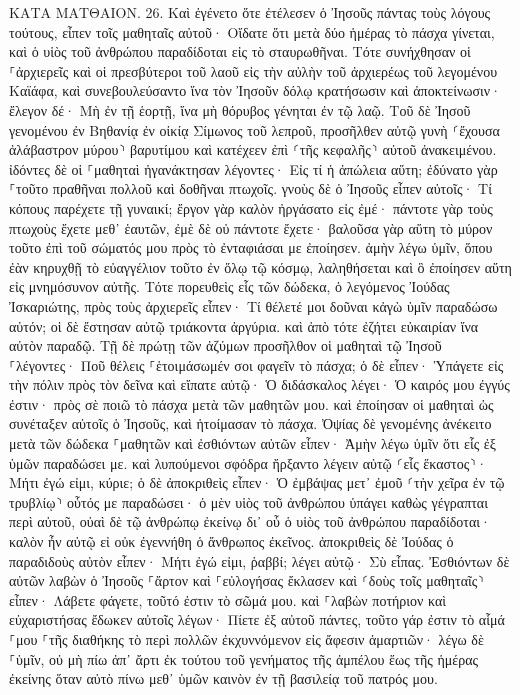 \documentclass[twoside, 9pt]{extreport}
\begin{document}
ΚΑΤΑ ΜΑΤΘΑΙΟΝ.
26.
Καὶ ἐγένετο ὅτε ἐτέλεσεν ὁ Ἰησοῦς πάντας τοὺς λόγους τούτους, εἶπεν τοῖς μαθηταῖς αὐτοῦ· 
Οἴδατε ὅτι μετὰ δύο ἡμέρας τὸ πάσχα γίνεται, καὶ ὁ υἱὸς τοῦ ἀνθρώπου παραδίδοται εἰς τὸ σταυρωθῆναι. 
Τότε συνήχθησαν οἱ ⸀ἀρχιερεῖς καὶ οἱ πρεσβύτεροι τοῦ λαοῦ εἰς τὴν αὐλὴν τοῦ ἀρχιερέως τοῦ λεγομένου Καϊάφα, 
καὶ συνεβουλεύσαντο ἵνα τὸν Ἰησοῦν δόλῳ κρατήσωσιν καὶ ἀποκτείνωσιν· 
ἔλεγον δέ· Μὴ ἐν τῇ ἑορτῇ, ἵνα μὴ θόρυβος γένηται ἐν τῷ λαῷ. 
Τοῦ δὲ Ἰησοῦ γενομένου ἐν Βηθανίᾳ ἐν οἰκίᾳ Σίμωνος τοῦ λεπροῦ, 
προσῆλθεν αὐτῷ γυνὴ ⸂ἔχουσα ἀλάβαστρον μύρου⸃ βαρυτίμου καὶ κατέχεεν ἐπὶ ⸂τῆς κεφαλῆς⸃ αὐτοῦ ἀνακειμένου. 
ἰδόντες δὲ οἱ ⸀μαθηταὶ ἠγανάκτησαν λέγοντες· Εἰς τί ἡ ἀπώλεια αὕτη; 
ἐδύνατο γὰρ ⸀τοῦτο πραθῆναι πολλοῦ καὶ δοθῆναι πτωχοῖς. 
γνοὺς δὲ ὁ Ἰησοῦς εἶπεν αὐτοῖς· Τί κόπους παρέχετε τῇ γυναικί; ἔργον γὰρ καλὸν ἠργάσατο εἰς ἐμέ· 
πάντοτε γὰρ τοὺς πτωχοὺς ἔχετε μεθ᾽ ἑαυτῶν, ἐμὲ δὲ οὐ πάντοτε ἔχετε· 
βαλοῦσα γὰρ αὕτη τὸ μύρον τοῦτο ἐπὶ τοῦ σώματός μου πρὸς τὸ ἐνταφιάσαι με ἐποίησεν. 
ἀμὴν λέγω ὑμῖν, ὅπου ἐὰν κηρυχθῇ τὸ εὐαγγέλιον τοῦτο ἐν ὅλῳ τῷ κόσμῳ, λαληθήσεται καὶ ὃ ἐποίησεν αὕτη εἰς μνημόσυνον αὐτῆς. 
Τότε πορευθεὶς εἷς τῶν δώδεκα, ὁ λεγόμενος Ἰούδας Ἰσκαριώτης, πρὸς τοὺς ἀρχιερεῖς 
εἶπεν· Τί θέλετέ μοι δοῦναι κἀγὼ ὑμῖν παραδώσω αὐτόν; οἱ δὲ ἔστησαν αὐτῷ τριάκοντα ἀργύρια. 
καὶ ἀπὸ τότε ἐζήτει εὐκαιρίαν ἵνα αὐτὸν παραδῷ. 
Τῇ δὲ πρώτῃ τῶν ἀζύμων προσῆλθον οἱ μαθηταὶ τῷ Ἰησοῦ ⸀λέγοντες· Ποῦ θέλεις ⸀ἑτοιμάσωμέν σοι φαγεῖν τὸ πάσχα; 
ὁ δὲ εἶπεν· Ὑπάγετε εἰς τὴν πόλιν πρὸς τὸν δεῖνα καὶ εἴπατε αὐτῷ· Ὁ διδάσκαλος λέγει· Ὁ καιρός μου ἐγγύς ἐστιν· πρὸς σὲ ποιῶ τὸ πάσχα μετὰ τῶν μαθητῶν μου. 
καὶ ἐποίησαν οἱ μαθηταὶ ὡς συνέταξεν αὐτοῖς ὁ Ἰησοῦς, καὶ ἡτοίμασαν τὸ πάσχα. 
Ὀψίας δὲ γενομένης ἀνέκειτο μετὰ τῶν δώδεκα ⸀μαθητῶν 
καὶ ἐσθιόντων αὐτῶν εἶπεν· Ἀμὴν λέγω ὑμῖν ὅτι εἷς ἐξ ὑμῶν παραδώσει με. 
καὶ λυπούμενοι σφόδρα ἤρξαντο λέγειν αὐτῷ ⸂εἷς ἕκαστος⸃· Μήτι ἐγώ εἰμι, κύριε; 
ὁ δὲ ἀποκριθεὶς εἶπεν· Ὁ ἐμβάψας μετ᾽ ἐμοῦ ⸂τὴν χεῖρα ἐν τῷ τρυβλίῳ⸃ οὗτός με παραδώσει· 
ὁ μὲν υἱὸς τοῦ ἀνθρώπου ὑπάγει καθὼς γέγραπται περὶ αὐτοῦ, οὐαὶ δὲ τῷ ἀνθρώπῳ ἐκείνῳ δι᾽ οὗ ὁ υἱὸς τοῦ ἀνθρώπου παραδίδοται· καλὸν ἦν αὐτῷ εἰ οὐκ ἐγεννήθη ὁ ἄνθρωπος ἐκεῖνος. 
ἀποκριθεὶς δὲ Ἰούδας ὁ παραδιδοὺς αὐτὸν εἶπεν· Μήτι ἐγώ εἰμι, ῥαββί; λέγει αὐτῷ· Σὺ εἶπας. 
Ἐσθιόντων δὲ αὐτῶν λαβὼν ὁ Ἰησοῦς ⸀ἄρτον καὶ ⸀εὐλογήσας ἔκλασεν καὶ ⸂δοὺς τοῖς μαθηταῖς⸃ εἶπεν· Λάβετε φάγετε, τοῦτό ἐστιν τὸ σῶμά μου. 
καὶ ⸀λαβὼν ποτήριον καὶ εὐχαριστήσας ἔδωκεν αὐτοῖς λέγων· Πίετε ἐξ αὐτοῦ πάντες, 
τοῦτο γάρ ἐστιν τὸ αἷμά ⸀μου ⸀τῆς διαθήκης τὸ περὶ πολλῶν ἐκχυννόμενον εἰς ἄφεσιν ἁμαρτιῶν· 
λέγω δὲ ⸀ὑμῖν, οὐ μὴ πίω ἀπ᾽ ἄρτι ἐκ τούτου τοῦ γενήματος τῆς ἀμπέλου ἕως τῆς ἡμέρας ἐκείνης ὅταν αὐτὸ πίνω μεθ᾽ ὑμῶν καινὸν ἐν τῇ βασιλείᾳ τοῦ πατρός μου. 
\end{document}
